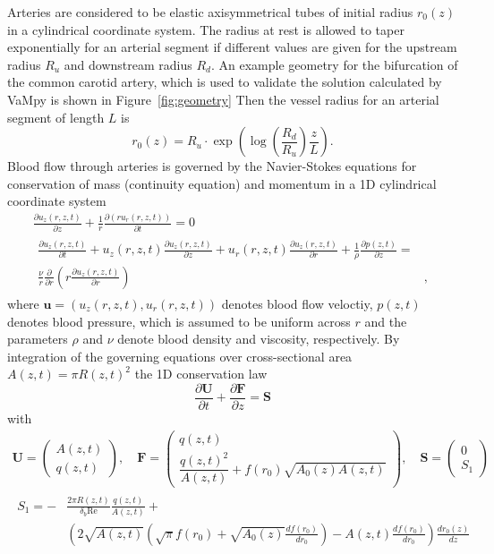 \documentclass{jors}
\begin{document}
Arteries are considered to be elastic axisymmetrical tubes of initial radius $r_0(z)$ in a cylindrical coordinate system. The radius at rest is allowed to taper exponentially for an arterial segment if different values are given for the upstream radius $R_u$ and downstream radius $R_d$. An example geometry for the bifurcation of the common carotid artery, which is used to validate the solution calculated by VaMpy is shown in Figure~\ref{fig:geometry} Then the vessel radius for an arterial segment of length $L$ is
\begin{equation}
r_0(z) = R_u \cdot \exp \left( \log \left( \frac{R_d}{R_u} \right) \frac{z}{L} \right).
\end{equation}
Blood flow through arteries is governed by the Navier-Stokes equations for conservation of mass (continuity equation) and momentum in a 1D cylindrical coordinate system
\begin{gather}
\frac{\partial u_z(r,z,t)}{\partial z} + \frac{1}{r} \frac{\partial \left( ru_r(r,z,t) \right)}{\partial t} = 0\\
\begin{split}
\frac{\partial u_z(r,z,t)}{\partial t} + u_z(r,z,t) \frac{\partial u_z(r,z,t)}{\partial z} + u_r(r,z,t) \frac{\partial u_z(r,z,t)}{\partial r} + \frac{1}{\rho} \frac{\partial p(z,t)}{\partial z} =&\\
\frac{\nu}{r} \frac{\partial}{\partial r} \left( r \frac{\partial u_z(r,z,t)}{\partial r} \right) &,
\end{split}
\end{gather}
where $\boldsymbol{u} = (u_z(r,z,t), u_r(r,z,t))$ denotes blood flow veloctiy, $p(z,t)$ denotes blood pressure, which is assumed to be uniform across $r$ and the parameters $\rho$ and $\nu$ denote blood density and viscosity, respectively. By integration of the governing equations over cross-sectional area $A(z,t) = \pi R(z,t)^2$ the 1D conservation law
\begin{equation}\label{eq:conservation}
\frac{\partial \boldsymbol{U}}{\partial t} + \frac{\partial \boldsymbol{F}}{\partial z} = \boldsymbol{S}
\end{equation}
with  
\begin{gather*}
  \boldsymbol{U} = \begin{pmatrix} A(z,t) \\ q(z,t) \end{pmatrix}, \quad \boldsymbol{F} = \begin{pmatrix} q(z,t)\\ \dfrac{q(z,t)^2}{A(z,t)} + f(r_0) \sqrt{A_0(z) A(z,t)} \end{pmatrix}, \quad \boldsymbol{S} = \begin{pmatrix} 0\\ S_1 \end{pmatrix}\\
  \begin{split}
    S_1 = -&\frac{2 \pi R(z,t)}{\delta_b \mathrm{Re}} \frac{q(z,t)}{A(z,t)} +\\
    &\left( 2 \sqrt{A(z,t)} \left( \sqrt{\pi} f(r_0) + \sqrt{A_0(z)} \frac{df(r_0)}{dr_0 } \right) - A(z,t) \frac{df(r_0)}{dr_0} \right) \frac{dr_0(z)}{dz}
  \end{split}
\end{gather*}
\end{document}
